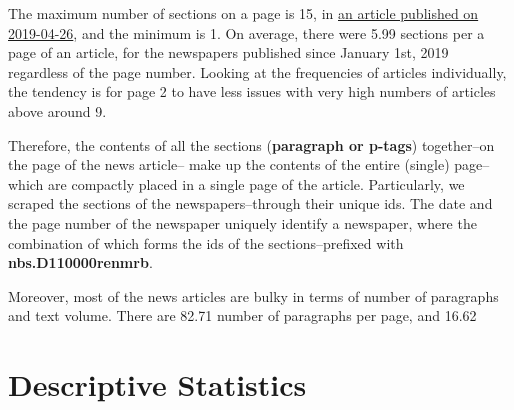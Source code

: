 \documentclass[12pt,a4paper]{article}
\begin{document}
The maximum number of sections on a page is 15, in \href{http://paper.people.com.cn/rmrb/html/2019-04/26/nbs.D110000renmrb_01.htm}{an article published on 2019-04-26}, and the minimum is 1. On average, there were 5.99 sections per a page of an article, for the newspapers published since January 1st, 2019 regardless of the page number. Looking at the frequencies of articles individually, the tendency is for page 2 to have less issues with very high numbers of articles above around 9.

Therefore, the contents of all the sections (\textbf{paragraph or p-tags}) together--on the page of the news article-- make up the contents of the entire (single) page--which are compactly placed in a single page of the article. Particularly, we scraped the sections of the newspapers--through their unique ids. The date and the page number of the newspaper uniquely identify a newspaper, where the combination of which forms the ids of the sections--prefixed with \textbf{nbs.D110000renmrb}.

Moreover, most of the news articles are bulky in terms of number of paragraphs and text volume. There are 82.71 number of paragraphs per page, and 16.62

\hypertarget{descriptive-statistics}{%
\section{Descriptive Statistics}\label{descriptive-statistics}}
\end{document}
